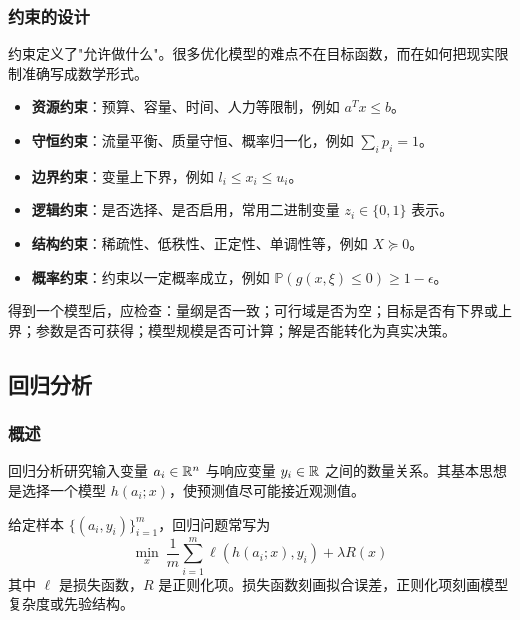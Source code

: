 \subsubsection{约束的设计}

约束定义了"允许做什么"。很多优化模型的难点不在目标函数，而在如何把现实限制准确写成数学形式。

\begin{conceptbox}[常见约束类型]
\begin{itemize}[itemsep=0.3em]
    \item \textbf{资源约束}：预算、容量、时间、人力等限制，例如 $a^T x \leq b$。
    \item \textbf{守恒约束}：流量平衡、质量守恒、概率归一化，例如 $\sum_i p_i = 1$。
    \item \textbf{边界约束}：变量上下界，例如 $l_i \leq x_i \leq u_i$。
    \item \textbf{逻辑约束}：是否选择、是否启用，常用二进制变量 $z_i \in \{0,1\}$ 表示。
    \item \textbf{结构约束}：稀疏性、低秩性、正定性、单调性等，例如 $X \succeq 0$。
    \item \textbf{概率约束}：约束以一定概率成立，例如 $\mathbb{P}(g(x,\xi)\leq0)\geq 1-\epsilon$。
\end{itemize}
\end{conceptbox}

\begin{notebox}[建模检查清单]
得到一个模型后，应检查：量纲是否一致；可行域是否为空；目标是否有下界或上界；参数是否可获得；模型规模是否可计算；解是否能转化为真实决策。
\end{notebox}

\subsection{回归分析}

\subsubsection{概述}

回归分析研究输入变量 $a_i \in \mathbb{R}^n$ 与响应变量 $y_i \in \mathbb{R}$ 之间的数量关系。其基本思想是选择一个模型 $h(a_i;x)$，使预测值尽可能接近观测值。

\begin{definition}[经验风险最小化]
给定样本 $\{(a_i,y_i)\}_{i=1}^m$，回归问题常写为
\[
\min_x\ \frac{1}{m}\sum_{i=1}^{m} \ell(h(a_i;x),y_i) + \lambda R(x)
\]
其中 $\ell$ 是损失函数，$R$ 是正则化项。损失函数刻画拟合误差，正则化项刻画模型复杂度或先验结构。
\end{definition}

